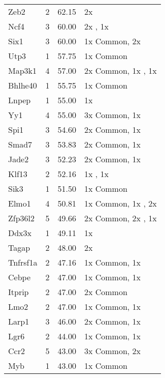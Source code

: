 {\begin{longtable}[l]{lccl}
Zeb2	&  \num{2}	&  \num{ 62.15}	& 2x  \dnmtchipregular\\ 
Ncf4	&  \num{3}	&  \num{ 60.00}	& 2x  \dnmtchipregular, 1x  \dnmtwtregular\\ 
Six1	&  \num{3}	&  \num{ 60.00}	& 1x Common, 2x  \dnmtchipregular\\ 
Utp3	&  \num{1}	&  \num{ 57.75}	& 1x Common\\ 
Map3k1	&  \num{4}	&  \num{ 57.00}	& 2x Common, 1x  \dnmtchipregular, 1x  \dnmtwtregular\\ 
Bhlhe40	&  \num{1}	&  \num{ 55.75}	& 1x Common\\ 
Lnpep	&  \num{1}	&  \num{ 55.00}	& 1x  \dnmtwtregular\\ 
Yy1	&  \num{4}	&  \num{ 55.00}	& 3x Common, 1x  \dnmtwtregular\\ 
Spi1	&  \num{3}	&  \num{ 54.60}	& 2x Common, 1x  \dnmtchipregular\\ 
Smad7	&  \num{3}	&  \num{ 53.83}	& 2x Common, 1x  \dnmtchipregular\\ 
Jade2	&  \num{3}	&  \num{ 52.23}	& 2x Common, 1x  \dnmtwtregular\\ 
Klf13	&  \num{2}	&  \num{ 52.16}	& 1x  \dnmtchipregular, 1x  \dnmtwtregular\\ 
Sik3	&  \num{1}	&  \num{ 51.50}	& 1x Common\\ 
Elmo1	&  \num{4}	&  \num{ 50.81}	& 1x Common, 1x  \dnmtchipregular, 2x  \dnmtwtregular\\ 
Zfp36l2	&  \num{5}	&  \num{ 49.66}	& 2x Common, 2x  \dnmtchipregular, 1x  \dnmtwtregular\\ 
Ddx3x	&  \num{1}	&  \num{ 49.11}	& 1x  \dnmtwtregular\\ 
Tagap	&  \num{2}	&  \num{ 48.00}	& 2x  \dnmtchipregular\\ 
Tnfrsf1a	&  \num{2}	&  \num{ 47.16}	& 1x Common, 1x  \dnmtwtregular\\ 
Cebpe	&  \num{2}	&  \num{ 47.00}	& 1x Common, 1x  \dnmtwtregular\\ 
Itprip	&  \num{2}	&  \num{ 47.00}	& 2x Common\\ 
Lmo2	&  \num{2}	&  \num{ 47.00}	& 1x Common, 1x  \dnmtwtregular\\ 
Larp1	&  \num{3}	&  \num{ 46.00}	& 2x Common, 1x  \dnmtwtregular\\ 
Lgr6	&  \num{2}	&  \num{ 44.00}	& 1x Common, 1x  \dnmtwtregular\\ 
Ccr2	&  \num{5}	&  \num{ 43.00}	& 3x Common, 2x  \dnmtchipregular\\ 
Myb	&  \num{1}	&  \num{ 43.00}	& 1x Common\\ 

\end{longtable}}
